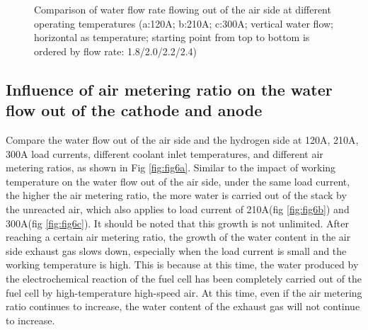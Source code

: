 \begin{figure}
{	}
	\caption{Comparison of water flow rate flowing out of the air side at different operating temperatures (a:120A; b:210A; c:300A; vertical water flow; horizontal as temperature; starting point from top to bottom is ordered by flow rate: 1.8/2.0/2.2/2.4)}
\end{figure}

\subsection{Influence of air metering ratio on the water flow out of the cathode and anode}

Compare the water flow out of the air side and the hydrogen side at 120A, 210A, 300A load currents, different coolant inlet temperatures, and different air metering ratios, as shown in Fig \ref{fig:fig6a}. Similar to the impact of working temperature on the water flow out of the air side, under the same load current, the higher the air metering ratio, the more water is carried out of the stack by the unreacted air, which also applies to load current of 210A(fig \ref{fig:fig6b}) and 300A(fig \ref{fig:fig6c}). It should be noted that this growth is not unlimited. After reaching a certain air metering ratio, the growth of the water content in the air side exhaust gas slows down, especially when the load current is small and the working temperature is high. This is because at this time, the water produced by the electrochemical reaction of the fuel cell has been completely carried out of the fuel cell by high-temperature high-speed air. At this time, even if the air metering ratio continues to increase, the water content of the exhaust gas will not continue to increase.

